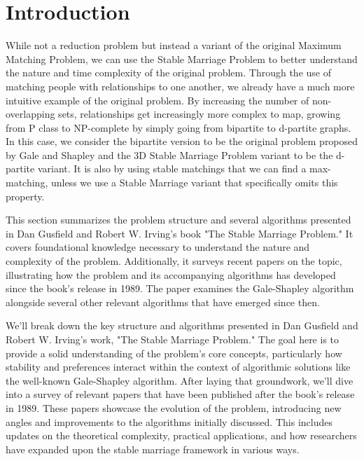 \section*{Introduction} 
While not a reduction problem but instead a variant of the original Maximum Matching Problem, we can use the Stable Marriage Problem to better understand the nature and time complexity of the original problem. Through the use of matching people with relationships to one another, we already have a much more intuitive example of the original problem. By increasing the number of non-overlapping sets, relationships get increasingly more complex to map, growing from P class to NP-complete by simply going from bipartite to d-partite graphs. In this case, we consider the bipartite version to be the original problem proposed by Gale and Shapley and the 3D Stable Marriage Problem variant to be the d-partite variant. It is also by using stable matchings that we can find a max-matching, unless we use a Stable Marriage variant that specifically omits this property. 

This section summarizes the problem structure and several algorithms presented in Dan Gusfield and Robert W. Irving's book "The Stable Marriage Problem." It covers foundational knowledge necessary to understand the nature and complexity of the problem. Additionally, it surveys recent papers on the topic, illustrating how the problem and its accompanying algorithms has developed since the book's release in 1989. The paper examines the Gale-Shapley algorithm \cite{galeshapley} alongside several other relevant algorithms that have emerged since then.  

We’ll break down the key structure and algorithms presented in Dan Gusfield and Robert W. Irving’s work, "The Stable Marriage Problem." The goal here is to provide a solid understanding of the problem’s core concepts, particularly how stability and preferences interact within the context of algorithmic solutions like the well-known Gale-Shapley algorithm. After laying that groundwork, we’ll dive into a survey of relevant papers that have been published after the book’s release in 1989. These papers showcase the evolution of the problem, introducing new angles and improvements to the algorithms initially discussed. This includes updates on the theoretical complexity, practical applications, and how researchers have expanded upon the stable marriage framework in various ways.

